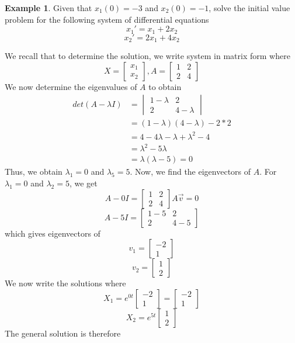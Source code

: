 \documentclass[11pt]{article}
\theoremstyle{plain} %
\theoremstyle{definition}
\theoremstyle{example}
\newtheorem*{example}{Example}
\theoremstyle{remark}
\begin{document}
\begin{example}
Given that $x_1(0) = -3$ and $x_2(0) = -1$, solve the initial value problem for the following system of differential equations $$x_1' = x_1+2x_2$$ $$x_2' = 2x_1+4x_2$$
\end{example}

We recall that to determine the solution, we write system in matrix form where $$X = \begin{bmatrix}x_1 \\ x_2\end{bmatrix}, A = \begin{bmatrix}1 & 2 \\ 2 & 4\end{bmatrix}$$ We now determine the eigenvalues of $A$ to obtain 
\begin{align*}
det(A - \lambda I)& = \begin{vmatrix}1-\lambda & 2 \\ 2 & 4-\lambda \end{vmatrix} \\
&= (1-\lambda)(4-\lambda) -2*2\\
&= 4 - 4\lambda -\lambda + \lambda^2 - 4 \\ 
&= \lambda^2 -5\lambda \\
&= \lambda(\lambda-5) = 0
\end{align*}
Thus, we obtain $\lambda_1 = 0$ and $\lambda_5 = 5$. Now, we find the eigenvectors of $A$. For $\lambda_1 = 0$ and $\lambda_2 = 5$, we get $$A - 0I = \begin{bmatrix}1 & 2 \\2 & 4\end{bmatrix}A\vec{v} = 0$$ $$A-5I = \begin{bmatrix}1-5 & 2 \\ 2 & 4-5\end{bmatrix}$$ which gives eigenvectors of $$v_1 = \begin{bmatrix}-2 \\ 1\end{bmatrix}$$$$v_2 = \begin{bmatrix}1 \\ 2\end{bmatrix}$$ We now write the solutions where $$X_1 = e^{0t}\begin{bmatrix}-2 \\ 1\end{bmatrix} = \begin{bmatrix}-2 \\ 1\end{bmatrix}$$ $$X_2 = e^{5t}\begin{bmatrix}1 \\ 2\end{bmatrix} $$ The general solution is therefore 
\end{document}
